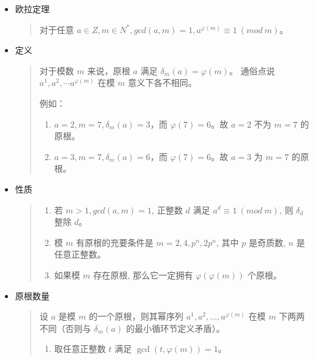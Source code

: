 \documentclass[a4paper,12pt]{article}
\begin{document}
\begin{itemize}
\item
    欧拉定理

    \begin{quote}
    对于任意
    \(a \in Z, m \in N^*, gcd(a,m)=1, a^{\varphi(m)} \equiv 1\ (mod\ m)\)。
    \end{quote}
    
\item
    定义

    \begin{quote}
    对于模数 \(m\) 来说，原根 \(a\) 满足 \(\delta_m(a) = \varphi(m)\)。
    通俗点说 \(a^1, a^2, \cdots a^{\varphi(m)}\) 在模 \(m\) 意义下各不相同。
    
    例如：
    
    \begin{enumerate}
    \def\labelenumi{\arabic{enumi}.}
    \item
        \(a=2,m=7,\delta_m(a) = 3\)，而 \(\varphi(7)=6\)。故 \(a=2\) 不为
        \(m=7\) 的原根。
    \item
        \(a=3,m=7,\delta_m(a)=6\)，而 \(\varphi(7)=6\)。故 \(a=3\) 为 \(m=7\)
        的原根。
    \end{enumerate}
    \end{quote}
\item 
    性质
    \begin{quote}
    \begin{enumerate}
    \def\labelenumi{\arabic{enumi}.}
    \item 
        若 \(m>1,gcd(a,m)=1\), 正整数 \(d\) 满足 \(a^d \equiv 1 \ (mod \ m)\), 
        则 \(\delta_d\) 整除 \(d \)。
    \item
        模 \(m\) 有原根的充要条件是 \(m=2,4,p^n,2p^n\), 其中 \(p\) 是奇质数, \(n\) 是任意正整数。
    \item
        如果模 \(m\) 存在原根, 那么它一定拥有 \(\varphi(\varphi(m))\) 个原根。
    \end{enumerate}
    \end{quote}
\item 
    原根数量
    \begin{quote}
        设 \( a \) 是模 \( m \) 的一个原根，则其幂序列 \( a^1, a^2, \ldots, a^{\varphi(m)} \) 在模 \( m \) 下两两不同（否则与 \( \delta_m(a) \) 的最小循环节定义矛盾）。

        \begin{enumerate}
            \item 
            取任意正整数 \( t \) 满足 \( \gcd(t, \varphi(m)) = 1 \)。
        

\end{enumerate}
\end{quote}
\end{itemize}
\end{document}
